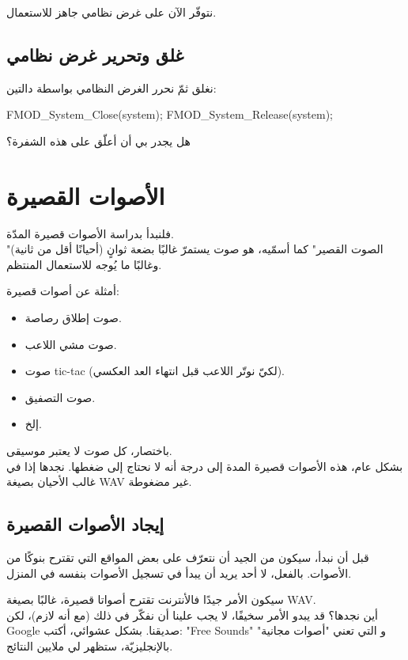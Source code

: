 نتوفّر الآن على غرض نظامي جاهز للاستعمال.

\subsection{غلق وتحرير غرض نظامي}

نغلق ثمّ نحرر الغرض النظامي بواسطة دالتين:

\begin{Csource}
FMOD_System_Close(system);
FMOD_System_Release(system);
\end{Csource}

هل يجدر بي أن أعلّق على هذه الشفرة؟

\section{الأصوات القصيرة}

فلنبدأ بدراسة الأصوات قصيرة المدّة.\\
"الصوت القصير"  كما أسمّيه، هو صوت يستمرّ غالبًا بضعة ثوانٍ (أحيانًا أقل من ثانية) وغالبًا ما يُوجه للاستعمال المنتظم.

أمثلة عن أصوات قصيرة:

\begin{itemize}
	\item صوت إطلاق رصاصة.
	\item صوت مشي اللاعب.
	\item صوت 
	\textenglish{tic-tac}
	(لكيّ نوتّر اللاعب قبل انتهاء العد العكسي).
	\item صوت التصفيق.
	\item إلخ.
\end{itemize}

باختصار، كل صوت لا يعتبر موسيقى.\\
بشكل عام، هذه الأصوات قصيرة المدة إلى درجة أنه لا نحتاج إلى ضغطها. نجدها إذا في غالب الأحيان بصيغة
\textenglish{WAV}
غير مضغوطة.

\subsection{إيجاد الأصوات القصيرة}

 قبل أن نبدأ، سيكون من الجيد أن نتعرّف على بعض المواقع التي تقترح بنوكًا من الأصوات. بالفعل، لا أحد يريد أن يبدأ في تسجيل الأصوات بنفسه في المنزل.
 
سيكون الأمر جيدًا فالأنترنت تقترح أصواتا قصيرة، غالبًا بصيغة 
\textenglish{WAV}.\\
أين نجدها؟ قد يبدو الأمر سخيفًا، لا يجب علينا أن نفكّر في ذلك (مع أنه لازم)، لكن
\textenglish{Google}
صديقنا. بشكل عشوائي، أكتب: 
"\textenglish{Free Sounds}"
و التي تعني "أصوات مجانية" بالإنجليزيّة، ستظهر لي ملايين النتائج.

